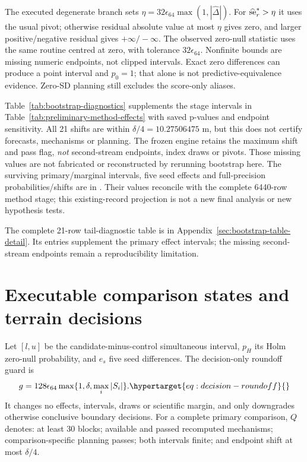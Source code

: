 The executed degenerate branch sets
\(\eta=32\epsilon_{64}\max(1,|\widehat\Delta|)\). For
\(\widehat{\rm se}_r^*>\eta\) it uses the usual pivot; otherwise residual
absolute value at most \(\eta\) gives zero, and larger positive/negative
residual gives \(+\infty/-\infty\). The observed zero-null statistic uses
the same routine centred at zero, with tolerance \(32\epsilon_{64}\).
Nonfinite bounds are missing numeric endpoints, not clipped intervals.
Exact zero differences can produce a point interval and \(p_0=1\);
that alone is not predictive-equivalence evidence. Zero-SD planning still
excludes the score-only aliases.

Table~\ref{tab:bootstrap-diagnostics} supplements the stage intervals in
Table~\ref{tab:preliminary-method-effects} with saved p-values and endpoint
sensitivity. All 21 shifts are within \(\delta/4=10.27506475\) m, but this
does not certify forecasts, mechanisms or planning. The frozen engine
retains the maximum shift and pass flag, \emph{not} second-stream endpoints,
index draws or pivots. Those missing values are not fabricated or reconstructed
by rerunning bootstrap here. The surviving primary/marginal intervals,
five seed effects and full-precision probabilities/shifts are in
. Their values reconcile
with the complete 6440-row method stage; this existing-record projection
is not a new final analysis or new hypothesis tests.

The complete 21-row tail-diagnostic table is in Appendix~\ref{sec:bootstrap-table-detail}.
Its entries supplement the primary effect intervals; the missing second-stream
endpoints remain a reproducibility limitation.


\section{Executable comparison states and terrain decisions}
\label{sec:decision-conditions}\hypertarget{sec:decision-conditions}{}
Let \([l,u]\) be the candidate-minus-control simultaneous interval,
\(p_H\) its Holm zero-null probability, and \(e_s\) five seed differences.
The decision-only roundoff guard is
\begin{equation}
 g=128\epsilon_{64}\max\{1,\delta,\max_i|S_i|\}.
 \label{eq:decision-roundoff}\hypertarget{eq:decision-roundoff}{}
\end{equation}
It changes no effects, intervals, draws or scientific margin, and only
downgrades otherwise conclusive boundary decisions. For a complete primary
comparison, \(Q\) denotes: at least 30 blocks; available and passed recomputed
mechanisms; comparison-specific planning passes; both intervals finite;
and endpoint shift at most \(\delta/4\).

